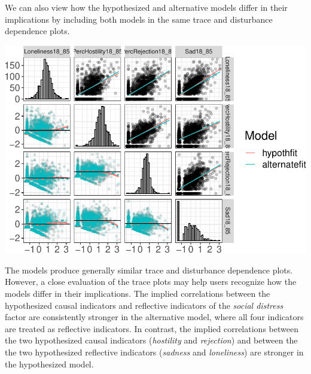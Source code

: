 \documentclass[
  english,
  doc]{apa6}
\begin{document}
We can also view how the hypothesized and alternative models differ in their implications by including both models in the same trace and disturbance dependence plots.

\includegraphics{flexplavaan_draft_files/figure-latex/unnamed-chunk-6-1.pdf}

The models produce generally similar trace and disturbance dependence plots. However, a close evaluation of the trace plots may help users recognize how the models differ in their implications. The implied correlations between the hypothesized causal indicators and reflective indicators of the \emph{social distress} factor are consistently stronger in the alternative model, where all four indicators are treated as reflective indicators. In contrast, the implied correlations between the two hypothesized causal indicators (\emph{hostility} and \emph{rejection}) and between the the two hypothesized reflective indicators (\emph{sadness} and \emph{loneliness}) are stronger in the hypothesized model.
\end{document}
